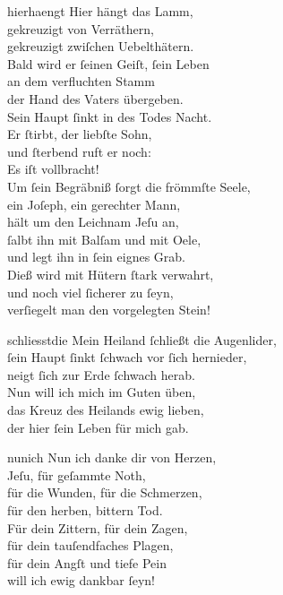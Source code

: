 \documentclass[tocstyle=ref-genre]{ees}
\begin{document}
{  \begin{movement}{hierhaengt}
    \voice[Tenore]
    Hier hängt das Lamm,\\
    gekreuzigt von Verräthern,\\
    gekreuzigt zwiſchen Uebelthätern.\\
    Bald wird er ſeinen Geiſt, ſein Leben\\
    an dem verfluchten Stamm\\
    der Hand des Vaters übergeben.\\
    Sein Haupt ſinkt in des Todes Nacht.\\
    Er ſtirbt, der liebſte Sohn,\\
    und ſterbend ruft er noch:\\
    Es iſt vollbracht!\\
    Um ſein Begräbniß ſorgt die frömmſte Seele,\\
    ein Joſeph, ein gerechter Mann,\\
    hält um den Leichnam Jeſu an,\\
    ſalbt ihn mit Balſam und mit Oele,\\
    und legt ihn in ſein eignes Grab.\\
    Dieß wird mit Hütern ſtark verwahrt,\\
    und noch viel ſicherer zu ſeyn,\\
    verſiegelt man den vorgelegten Stein!
  \end{movement}

  \begin{movement}{schliesstdie}
    \voice[Tenore]
    Mein Heiland ſchließt die Augenlider,\\
    ſein Haupt ſinkt ſchwach vor ſich hernieder,\\
    neigt ſich zur Erde ſchwach herab.\\[1ex]
    Nun will ich mich im Guten üben,\\
    das Kreuz des Heilands ewig lieben,\\
    der hier ſein Leben für mich gab.
  \end{movement}

  \begin{movement}{nunich}
    \voice[Coro]
    Nun ich danke dir von Herzen,\\
    Jeſu, für geſammte Noth,\\
    für die Wunden, für die Schmerzen,\\
    für den herben, bittern Tod.\\
    Für dein Zittern, für dein Zagen,\\
    für dein tauſendfaches Plagen,\\
    für dein Angſt und tiefe Pein\\
    will ich ewig dankbar ſeyn!
  \end{movement}
}

\eesScore
\end{document}
